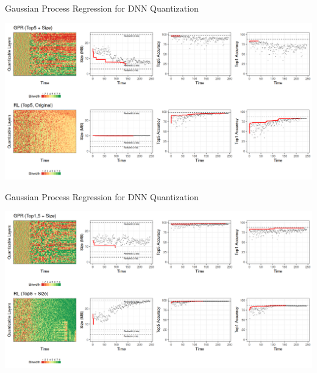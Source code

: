 \documentclass[10pt, compress, aspectratio=169, xcolor={table,usenames,dvipsnames}]{beamer}
\begin{document}
\begin{frame}[label={sec:org1cd93c4}]{Gaussian Process Regression for DNN Quantization}
\begin{center}
\includegraphics[width=\columnwidth]{../../../img/gpr_rloriginal_comparison.png}
\end{center}
\end{frame}

\begin{frame}[label={sec:org6b4072f}]{Gaussian Process Regression for DNN Quantization}
\begin{center}
\includegraphics[width=\columnwidth]{../../../img/gpr_rl_comparison.png}
\end{center}
\end{frame}
\end{document}
